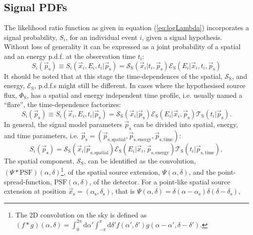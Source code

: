 \documentclass{article}
\newcommand{\eq}[1]{(\ref{#1})}
\newcommand{\ps}{\vec{p}_{\mathrm{s}}}
\newcommand{\xs}{\vec{x}_{\mathrm{s}}}
\begin{document}
\subsection{Signal PDFs}

The likelihood ratio function as given in equation \eq{eq:logLambda}
incorporates a signal probability, $S_i$, for an individual event $i$, given a
signal hypothesis.
Without loss of generality it can be expressed as a joint probability of a
spatial and an energy p.d.f. at the observation time $t_i$:
\begin{equation}
 S_i(\ps) \equiv S_i(\vec{x}_i, E_i, t_i|\ps) = \mathcal{S}_{\mathrm{S}}(\vec{x}_i|t_i,\ps) \mathcal{E}_{\mathrm{S}}(E_i|\vec{x}_i,t_i,\ps)
\end{equation}
It should be noted that at this stage the time-dependences of the spatial,
$\mathcal{S}_{\mathrm{S}}$, and energy, $\mathcal{E}_{\mathrm{S}}$, p.d.f.s
might still be different. In cases where the hypothesised source flux,
$\Phi_{\mathrm{S}}$, has a spatial and energy independent time profile, i.e.
usually named a ``flare'', the time-dependence factorizes:
\begin{equation}
 S_i(\ps) \equiv S_i(\vec{x}_i, E_i, t_i|\ps) = \mathcal{S}_{\mathrm{S}}(\vec{x}_i|\ps) \mathcal{E}_{\mathrm{S}}(E_i|\vec{x}_i,\ps) \mathcal{T}_{\mathrm{S}}(t_i|\ps).
\end{equation}
In general, the signal model parameters $\ps$ can be divided into spatial,
energy, and time parameters, i.e. $\ps = (\vec{p}_{\mathrm{s,spatial}},
\vec{p}_{\mathrm{s,energy}}, \vec{p}_{\mathrm{s,time}})$:
\begin{equation}
 S_i(\ps) = \mathcal{S}_{\mathrm{S}}(\vec{x}_i|\vec{p}_{\mathrm{s,spatial}}) \mathcal{E}_{\mathrm{S}}(E_i|\vec{x}_i,\vec{p}_{\mathrm{s,energy}}) \mathcal{T}_{\mathrm{S}}(t_i|\vec{p}_{\mathrm{s,time}}),
 \label{eq:Si}
\end{equation}
The spatial component,
$\mathcal{S}_{\mathrm{S}}$, can be identified as the convolution,
$(\Psi \ast \mathrm{PSF})(\alpha,\delta)$\footnote{The 2D convolution on the sky
is defined as
$(f \ast g)(\alpha,\delta) = \int_{0}^{2\pi} \mathrm{d}\alpha' \int_{-\pi}^{\pi} \mathrm{d}\delta' f(\alpha',\delta')g(\alpha-\alpha',\delta-\delta')$.},
of the spatial source extension, $\Psi(\alpha,\delta)$, and the point-spread-function,
$\mathrm{PSF}(\alpha,\delta)$, of the detector.
For a point-like spatial source extension at position
$\xs = (\alpha_{\mathrm{s}},\delta_{\mathrm{s}})$, that is
$\Psi(\alpha,\delta) = \delta(\alpha-\alpha_{\mathrm{s}})\delta(\delta-\delta_{\mathrm{s}})$,
\end{document}
